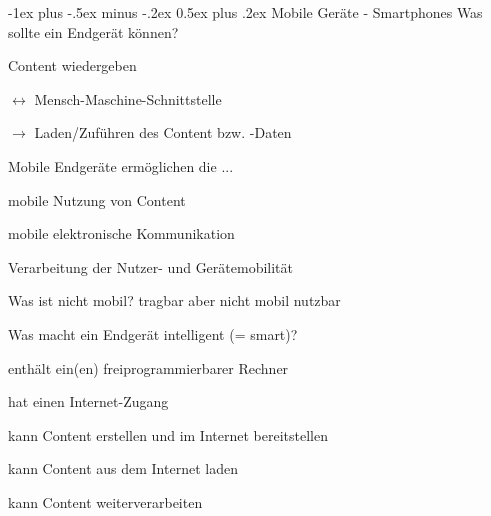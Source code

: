 \documentclass[a4paper]{article}
\makeatletter
\renewcommand{\section}{\@startsection{section}{1}{0mm}%
                                {-1ex plus -.5ex minus -.2ex}%
                                {0.5ex plus .2ex}%
                                {\normalfont\large\bfseries}}
\makeatother
\begin{document}
\begin{multicols*}{2}
  \setlength{\premulticols}{1pt}
  \setlength{\postmulticols}{1pt}
  \setlength{\multicolsep}{1pt}
  \setlength{\columnsep}{2pt}
  \raggedright

  \section{Mobile Geräte - Smartphones}
  Was sollte ein Endgerät können?
  \begin{itemize*}
    \item Content wiedergeben
    \item $\leftrightarrow$ Mensch-Maschine-Schnittstelle
    \item $\rightarrow$ Laden/Zuführen des Content bzw. -Daten
  \end{itemize*}

  \begin{itemize*}
    \item Mobile Endgeräte ermöglichen die ...
    \begin{itemize*}
      \item mobile Nutzung von Content
      \item mobile elektronische Kommunikation
      \item Verarbeitung der Nutzer- und Gerätemobilität
    \end{itemize*}
    \item Was ist nicht mobil? tragbar aber nicht mobil nutzbar
  \end{itemize*}

  Was macht ein Endgerät intelligent (= smart)?
  \begin{itemize*}
    \item enthält ein(en) freiprogrammierbarer Rechner
    \item hat einen Internet-Zugang
    \item kann Content erstellen und im Internet bereitstellen
    \item kann Content aus dem Internet laden
    \item kann Content weiterverarbeiten
  \end{itemize*}


\end{multicols*}
\end{document}
